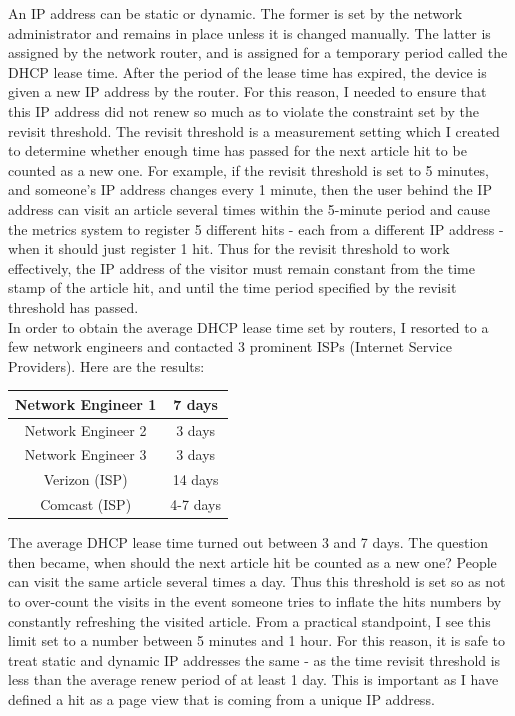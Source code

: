 \documentclass[12pt]{article}
\begin{document}
An IP address can be static or dynamic. The former is set by the network administrator and remains in place unless it is changed manually. The latter is assigned by the network router, and is assigned for a temporary period called the DHCP lease time. After the period of the lease time has expired, the device is given a new IP address by the router. For this reason, I needed to ensure that this IP address did not renew so much as to violate the constraint set by the revisit threshold. The revisit threshold is a measurement setting which I created to determine whether enough time has passed for the next article hit to be counted as a new one. For example, if the revisit threshold is set to 5 minutes, and someone's IP address changes every 1 minute, then the user behind the IP address can visit an article several times within the 5-minute period and cause the metrics system to register 5 different hits - each from a different IP address - when it should just register 1 hit. Thus for the revisit threshold to work effectively, the IP address of the visitor must remain constant from the time stamp of the article hit, and until the time period specified by the revisit threshold has passed. \\
In order to obtain the average DHCP lease time set by routers, I resorted to a few network engineers and contacted 3 prominent ISPs (Internet Service Providers). Here are the results:
\vspace{0.3in}

\begin{tabular}{| c | c |}
  \hline                       
  Network Engineer 1 & 7 days \\[1ex] \hline
  Network Engineer 2 & 3 days \\[1ex] \hline
  Network Engineer 3 & 3 days \\ [1ex] \hline
  Verizon (ISP) & 14 days \\[1ex] \hline
  Comcast (ISP) & 4-7 days \\[1ex]
  \hline  
\end{tabular}
\vspace{0.3in}

The average DHCP lease time turned out between 3 and 7 days. The question then became, when should the next article hit be counted as a new one? People can visit the same article several times a day. Thus this threshold is set so as not to over-count the visits in the event someone tries to inflate the hits numbers by constantly refreshing the visited article. From a practical standpoint, I see this limit set to a number between 5 minutes and 1 hour. For this reason, it is safe to treat static and dynamic IP addresses the same - as the time revisit threshold is less than the average renew period of at least 1 day. This is important as I have defined a hit as a page view that is coming from a unique IP address.
\end{document}
